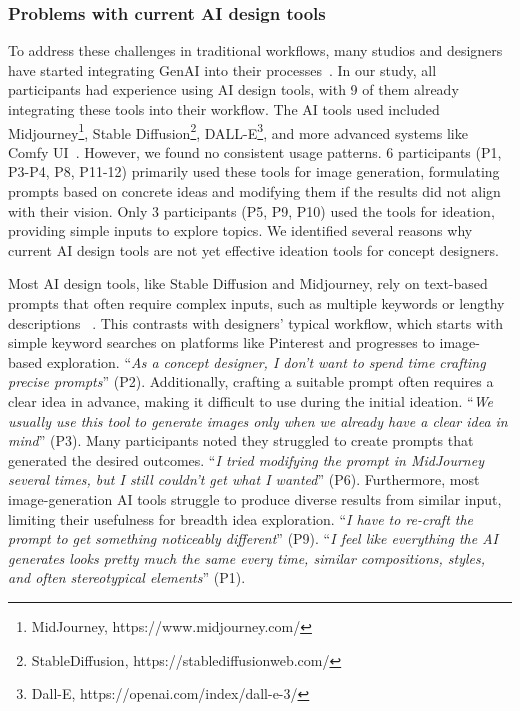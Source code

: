 \subsubsection{Problems with current AI design tools}
To address these challenges in traditional workflows, many studios and designers have started integrating GenAI into their processes~\cite{boucher2024resistance, ko2023large, filmhandbook2024, vimpari2023adapt}. In our study, all participants had experience using AI design tools, with 9 of them already integrating these tools into their workflow. The AI tools used included Midjourney\footnote{MidJourney, https://www.midjourney.com/}, Stable Diffusion\footnote{StableDiffusion, https://stablediffusionweb.com/}, DALL-E\footnote{Dall-E, https://openai.com/index/dall-e-3/}, and more advanced systems like Comfy UI~\cite{comfyui}. However, we found no consistent usage patterns. 6 participants (P1, P3-P4, P8, P11-12) primarily used these tools for image generation, formulating prompts based on concrete ideas and modifying them if the results did not align with their vision. Only 3 participants (P5, P9, P10) used the tools for ideation, providing simple inputs to explore topics. We identified several reasons why current AI design tools are not yet effective ideation tools for concept designers.

Most AI design tools, like Stable Diffusion and Midjourney, rely on text-based prompts that often require complex inputs, such as multiple keywords or lengthy descriptions ~\cite{mahdavi2024ai}. This contrasts with designers' typical workflow, which starts with simple keyword searches on platforms like Pinterest and progresses to image-based exploration. “\textit{As a concept designer, I don’t want to spend time crafting precise prompts}” (P2). Additionally, crafting a suitable prompt often requires a clear idea in advance, making it difficult to use during the initial ideation. “\textit{We usually use this tool to generate images only when we already have a clear idea in mind}” (P3). Many participants noted they struggled to create prompts that generated the desired outcomes. “\textit{I tried modifying the prompt in MidJourney several times, but I still couldn’t get what I wanted}” (P6). Furthermore, most image-generation AI tools struggle to produce diverse results from similar input, limiting their usefulness for breadth idea exploration. “\textit{I have to re-craft the prompt to get something noticeably different}” (P9). “\textit{I feel like everything the AI generates looks pretty much the same every time, similar compositions, styles, and often stereotypical elements}” (P1).

